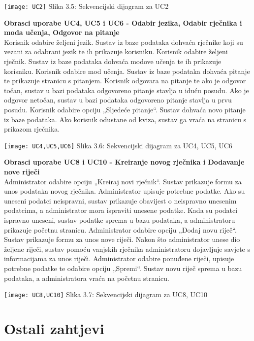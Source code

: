 				\texttt{[image: UC2]}
				Slika 3.5: Sekvencijski dijagram za UC2\newpage				
				
				
				\noindent\textbf{Obrasci uporabe UC4, UC5 i UC6 - Odabir jezika, Odabir rječnika i moda učenja, Odgovor na pitanje}\\
				Korisnik odabire željeni jezik. Sustav iz baze podataka dohvaća rječnike koji su vezani za odabrani jezik te ih prikazuje korisniku. Korisnik odabire željeni rječnik. Sustav iz baze podataka dohvaća modove učenja te ih prikazuje korisniku. Korisnik odabire mod učenja. Sustav iz baze podataka dohvaća pitanje te prikazuje stranicu s pitanjem. Korisnik odgovara na pitanje te ako je odgovor točan, sustav u bazi podataka odgovoreno pitanje stavlja u iduću posudu. Ako je odgovor netočan, sustav u bazi podataka odgovoreno pitanje stavlja u prvu posudu. Korisnik odabire opciju „Sljedeće pitanje“. Sustav dohvaća novo pitanje iz baze podataka. Ako korisnik odustane od kviza, sustav ga vraća na stranicu s prikazom rječnika.
				
				\texttt{[image: UC4,UC5,UC6]}
				Slika 3.6: Sekvencijski dijagram za UC4, UC5, UC6\newpage
				
				
				\noindent\textbf{Obrasci uporabe UC8 i UC10 - Kreiranje novog rječnika i Dodavanje nove riječi}\\
				Administrator odabire opciju „Kreiraj novi rječnik“. Sustav prikazuje formu za unos podataka novog rječnika. Administrator upisuje potrebne podatke. Ako su uneseni podatci neispravni, sustav prikazuje obavijest o neispravno unesenim podatcima, a administrator mora ispraviti unesene podatke. Kada su podatci ispravno uneseni, sustav podatke sprema u bazu podataka, a administratoru prikazuje početnu stranicu. Administrator odabire opciju „Dodaj novu riječ“. Sustav prikazuje formu za unos nove riječi. Nakon što administrator unese dio željene riječi, sustav pomoću vanjskih rječnika administratoru dojavljuje savjete s informacijama za unos riječi. Administrator odabire ponuđene riječi, upisuje potrebne podatke te odabire opciju „Spremi“. Sustav novu riječ sprema u bazu podataka, a administratora vraća na početnu stranicu.
				
				\texttt{[image: UC8,UC10]}
				Slika 3.7: Sekvencijski dijagram za UC8, UC10\newpage
	
		\section{Ostali zahtjevi}
		
